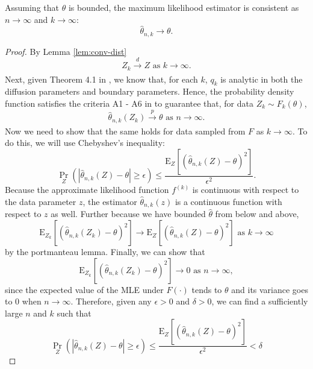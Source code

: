 \begin{lemma}
  Assuming that $\theta$ is bounded, the maximum likelihood estimator
  is consistent as $n \to \infty$ and
  $k \to \infty$: \[ \hat{\theta}_{n,k} \to \theta. \]
\end{lemma}
\begin{proof}
  By Lemma \ref{lem:conv-dist}
    \[ Z_k \xrightarrow[]{d} Z \mbox { as } k \to \infty. \] Next,
    given Theorem 4.1 in \cite{singler2008differentiability}, we know
    that, for each $k$, $q_k$ is analytic in both the diffusion
    parameters and boundary parameters. Hence, the probability density
    function satisfies the criteria A1 - A6 in
    \cite{casella2002statistical} to guarantee that, for data
    $Z_{k} \sim F_k(\theta)$,
    \[ \hat{\theta}_{n,k}(Z_k) \xrightarrow[]{p} \theta \mbox{ as } n
      \to \infty. \]
    Now we need to show that the same holds for data sampled from $F$
    as $k \to \infty$. To do this, we will use Chebyshev's inequality:
      \[
    \Pr_{Z}\left( \left| \hat{\theta}_{n,k}(Z) - \theta \right| \geq
      \epsilon \right) \leq \frac{ \mbox{E}_{Z}\left[
        (\hat{\theta}_{n,k}(Z) - \theta)^2 \right] }{ \epsilon^2 }.
  \]
  Because the approximate likelihood function $f^{(k)}$ is continuous
  with respect to the data parameter $z$, the estimator
  $\hat{\theta}_{n,k}(z)$ is a continuous function with respect to $z$
  as well. Further because we have bounded $\hat{\theta}$ from below
  and above,
  \[
    \mbox{E}_{Z_k}\left[ (\hat{\theta}_{n,k}(Z_k) - \theta)^2 \right]
    \to \mbox{E}_{Z}\left[ (\hat{\theta}_{n,k}(Z) - \theta)^2 \right]
    \mbox{ as } k \to \infty
  \]
  by the portmanteau lemma. Finally, we can show that
  \begin{equation}
    \mbox{E}_{Z_k}\left[ (\hat{\theta}_{n,k}(Z_k) - \theta)^2 \right]
    \to 0 \mbox{ as } n \to \infty, \label{eq:var-lim}
  \end{equation}
  since the expected value of the MLE under $F(\cdot)$ tends to
  $\theta$ and its variance goes to 0 when $n \to \infty$. Therefore,
  given any $\epsilon > 0$ and $\delta > 0$, we can find a
  sufficiently large $n$ and $k$ such that
  \[
    \Pr_{Z}\left( \left| \hat{\theta}_{n,k}(Z) - \theta \right| \geq
      \epsilon \right) \leq \frac{ \mbox{E}_{Z}\left[
        (\hat{\theta}_{n,k}(Z) - \theta)^2 \right] }{ \epsilon^2 } < \delta
  \]
\end{proof}

